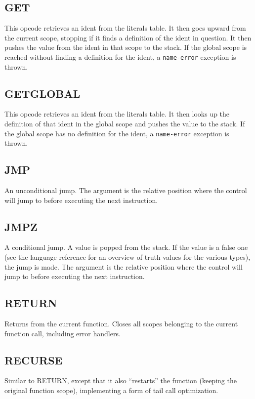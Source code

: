\subsection{GET}
\label{sec:get}
This opcode retrieves an ident from the literals table. It then goes
upward from the current scope, stopping if it finds a definition of the
ident in question. It then pushes the value from the ident in that scope
to the stack. If the global scope is reached without finding a
definition for the ident, a \verb!name-error! exception is thrown.

\subsection{GET\textunderscore{}GLOBAL}
\label{sec:get-global}
This opcode retrieves an ident from the literals table. It then looks up
the definition of that ident in the global scope and pushes the value to
the stack. If the global scope has no definition for the ident, a
\verb!name-error! exception is thrown.

\subsection{JMP}
\label{sec:jmp}
An unconditional jump. The argument is the relative position where the
control will jump to before executing the next instruction.

\subsection{JMPZ}
\label{sec:jmpz}
A conditional jump. A value is popped from the stack. If the value is
a false one (see the language reference for an overview of truth values
for the various types), the jump is made. The argument is the relative
position where the control will jump to before executing the next
instruction.

\subsection{RETURN}
\label{sec:return}
Returns from the current function. Closes all scopes belonging to the
current function call, including error handlers.

\subsection{RECURSE}
\label{sec:recurse}
Similar to RETURN, except that it also ``restarts'' the function
(keeping the original function scope), implementing a form of tail call
optimization.

